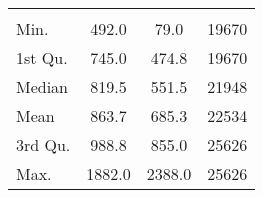 \begin{tabular}{lS[table-format=5.1]S[table-format=5.1]S[table-format=5.1]}
&  &  &  \\
 Min.    & 492.0 & 79.0 & 19670 \\
 1st Qu. & 745.0 & 474.8 & 19670 \\
 Median  & 819.5 & 551.5 & 21948 \\
 Mean    & 863.7 & 685.3 & 22534 \\
 3rd Qu. & 988.8 & 855.0 & 25626 \\
 Max.    & 1882.0 & 2388.0 & 25626 \\
\end{tabular}
